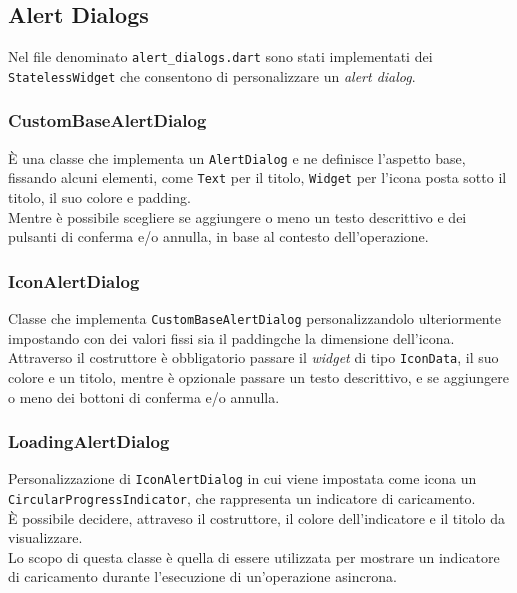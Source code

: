 \subsection{Alert Dialogs}
\label{subsec:alert-dialogs}

Nel file denominato \lstinline{alert_dialogs.dart} sono stati implementati dei \lstinline{StatelessWidget} che consentono di personalizzare un \emph{alert dialog}.

\subsubsection*{CustomBaseAlertDialog}
\label{subsubsec:custom-base-alert-dialog}

È una classe che implementa un \lstinline{AlertDialog}\cite{site:alert-dialog} e ne definisce l'aspetto base, fissando alcuni elementi, come \lstinline{Text}\cite{site:text} per il titolo, \lstinline{Widget} per l'icona posta sotto il titolo, il suo colore e \gls{padding}\glsoccur.\\
Mentre è possibile scegliere se aggiungere o meno un testo descrittivo e dei pulsanti di conferma e/o annulla, in base al contesto dell'operazione.

\subsubsection*{IconAlertDialog}
\label{subsubsec:icon-alert-dialog}

Classe che implementa \lstinline{CustomBaseAlertDialog} personalizzandolo ulteriormente impostando con dei valori fissi sia il \gls{padding}\glsoccur che la dimensione dell'icona.\\
Attraverso il costruttore è obbligatorio passare il \emph{widget} di tipo \lstinline{IconData}\cite{site:icon-data}, il suo colore e un titolo, mentre è opzionale passare un testo descrittivo, e se aggiungere o meno dei bottoni di conferma e/o annulla.

\subsubsection*{LoadingAlertDialog}
\label{subsubsec:loading-alert-dialog}

Personalizzazione di \lstinline{IconAlertDialog} in cui viene impostata come icona un \lstinline{CircularProgressIndicator}\cite{site:circular-progress-indicator}, che rappresenta un indicatore di caricamento.\\
È possibile decidere, attraveso il costruttore, il colore dell'indicatore e il titolo da visualizzare.\\
Lo scopo di questa classe è quella di essere utilizzata per mostrare un indicatore di caricamento durante l'esecuzione di un'operazione asincrona.

